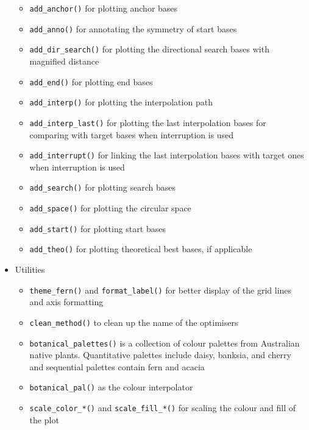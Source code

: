 \begin{itemize}
  \begin{itemize}
  \tightlist
  \item
    \texttt{add\_anchor()} for plotting anchor bases
  \item
    \texttt{add\_anno()} for annotating the symmetry of start bases
  \item
    \texttt{add\_dir\_search()} for plotting the directional search
    bases with magnified distance
  \item
    \texttt{add\_end()} for plotting end bases
  \item
    \texttt{add\_interp()} for plotting the interpolation path
  \item
    \texttt{add\_interp\_last()} for plotting the last interpolation
    bases for comparing with target bases when interruption is used
  \item
    \texttt{add\_interrupt()} for linking the last interpolation bases
    with target ones when interruption is used
  \item
    \texttt{add\_search()} for plotting search bases
  \item
    \texttt{add\_space()} for plotting the circular space
  \item
    \texttt{add\_start()} for plotting start bases
  \item
    \texttt{add\_theo()} for plotting theoretical best bases, if
    applicable
  \end{itemize}
\item
  Utilities

  \begin{itemize}
  \tightlist
  \item
    \texttt{theme\_fern()} and \texttt{format\_label()} for better
    display of the grid lines and axis formatting
  \item
    \texttt{clean\_method()} to clean up the name of the optimisers
  \item
    \texttt{botanical\_palettes()} is a collection of colour palettes
    from Australian native plants. Quantitative palettes include daisy,
    banksia, and cherry and sequential palettes contain fern and acacia
  \item
    \texttt{botanical\_pal()} as the colour interpolator
  \item
    \texttt{scale\_color\_*()} and \texttt{scale\_fill\_*()} for scaling
    the colour and fill of the plot
  \end{itemize}
\end{itemize}

